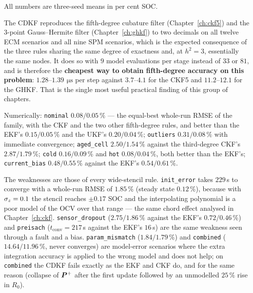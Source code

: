 All numbers are three-seed means in per cent SOC.

The CDKF reproduces the fifth-degree cubature filter (Chapter~\ref{ch:ckf5}) and the $3$-point
Gauss--Hermite filter (Chapter~\ref{ch:ghkf}) to two decimals on all twelve ECM scenarios and
all nine SPM scenarios, which is the expected consequence of the three rules sharing the same
degree of exactness and, at $h^2 = 3$, essentially the same nodes. It does so with $9$ model
evaluations per stage instead of $33$ or $81$, and is therefore the \textbf{cheapest way to
obtain fifth-degree accuracy on this problem}: $1.28$--$1.39\,\SI{}{\micro\second}$ per step
against $3.7$--$4.1$ for the CKF5 and $11.2$--$12.1$ for the GHKF. That is the single most
useful practical finding of this group of chapters.

Numerically: \texttt{nominal} $0.08/0.05\,\%$ --- the equal-best whole-run RMSE of the family,
with the CKF and the two other fifth-degree rules, and better than the EKF's $0.15/0.05\,\%$
and the UKF's $0.20/0.04\,\%$; \texttt{outliers} $0.31/0.08\,\%$ with immediate convergence;
\texttt{aged\_cell} $2.50/1.54\,\%$ against the third-degree CKF's $2.87/1.79\,\%$;
\texttt{cold} $0.16/0.09\,\%$ and \texttt{hot} $0.08/0.04\,\%$, both better than the EKF's;
\texttt{current\_bias} $0.48/0.55\,\%$ against the EKF's $0.54/0.61\,\%$.

The weaknesses are those of every wide-stencil rule. \texttt{init\_error} takes $229$\,s to
converge with a whole-run RMSE of $1.85\,\%$ (steady state $0.12\,\%$), because with
$\sigma_z = 0.1$ the stencil reaches $\pm0.17$ SOC and the interpolating polynomial is a
poor model of the OCV over that range --- the same chord effect analysed in
Chapter~\ref{ch:ckf}. \texttt{sensor\_dropout} ($2.75/1.86\,\%$ against the EKF's
$0.72/0.46\,\%$) and \texttt{preisach} ($t_{\text{conv}} = 217$\,s against the EKF's $16$\,s)
are the same weakness seen through a fault and a bias. \texttt{param\_mismatch}
($1.84/1.79\,\%$) and \texttt{combined} ($14.64/11.96\,\%$, never converges) are model-error
scenarios where the extra integration accuracy is applied to the wrong model and does not help;
on \texttt{combined} the CDKF fails exactly as the EKF and CKF do, and for the same reason
(collapse of $\bm{P}^{+}$ after the first update followed by an unmodelled $25\,\%$ rise in $R_0$).

